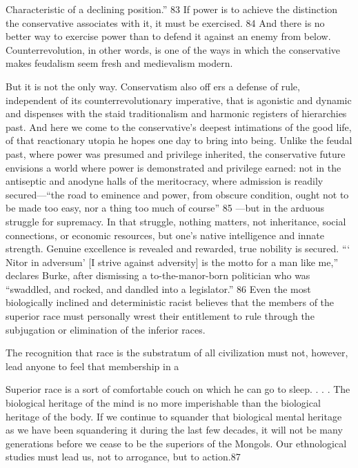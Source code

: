  \par 
Characteristic of a declining position.” {\color{blue}83} If power is to achieve the distinction the conservative associates with it, it must be exercised. {\color{blue}84} And there is no better way to exercise power than to defend it against an enemy from below. Counterrevolution, in other words, is one of the ways in which the conservative makes feudalism seem fresh and medievalism modern.
 \par 
But it is not the only way. Conservatism also off ers a defense of rule, independent of its counterrevolutionary imperative, that is agonistic and dynamic and dispenses with the staid traditionalism and harmonic registers of hierarchies past. And here we come to the conservative’s deepest intimations of the good life, of that reactionary utopia he hopes one day to bring into being. Unlike the feudal past, where power was presumed and privilege inherited, the conservative future envisions a world where power is demonstrated and privilege earned: not in the antiseptic and anodyne halls of the meritocracy, where admission is readily secured—“the road to eminence and power, from obscure condition, ought not to be made too easy, nor a thing too much of course” {\color{blue}85} —but in the arduous struggle for supremacy. In that struggle, nothing matters, not inheritance, social connections, or economic resources, but one’s native intelligence and innate strength. Genuine excellence is revealed and rewarded, true nobility is secured. “‘ Nitor in adversum’ [I strive against adversity] is the motto for a man like me,” declares Burke, after dismissing a to-the-manor-born politician who was “swaddled, and rocked, and dandled into a legislator.” {\color{blue}86} Even the most biologically inclined and deterministic racist believes that the members of the superior race must personally wrest their entitlement to rule through the subjugation or elimination of the inferior races.
 \par 
The recognition that race is the substratum of all civilization must not, however, lead anyone to feel that membership in a
 \par 
Superior race is a sort of comfortable couch on which he can go to sleep. . . . The biological heritage of the mind is no more imperishable than the biological heritage of the body. If we continue to squander that biological mental heritage as we have been squandering it during the last few decades, it will not be many generations before we cease to be the superiors of the Mongols. Our ethnological studies must lead us, not to arrogance, but to action.{\color{blue}87}

